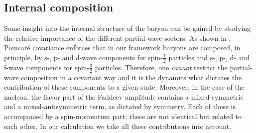 \subsection*{Internal composition}\label{subsec:internal_composition}
Some insight into the internal structure of the baryon can be gained by 
studying the relative importance of the different partial-wave sectors. 
As shown in \cite{Eichmann:2009qa,Eichmann:2009en,SanchisAlepuz:2011jn}, 
Poincar\'e covariance enforces that in our framework baryons are composed, 
in principle, by s-, p- and d-wave components for spin-$\frac{1}{2}$ 
particles and s-, p-, d- and f-wave components for spin-$\frac{3}{2}$
particles. Therefore, one \textit{cannot} restrict the partial-wave 
composition in a covariant way and it is the dynamics what 
dictates the contribution of these components to a given state. Moreover, 
in the case of the nucleon, the flavor part of the Faddeev amplitude contains 
a mixed-symmetric and a mixed-antisymmetric term, as dictated by symmetry. 
Each of these is accompanied by a spin-momentum part; these are not identical
but related to each other. In our calculation we take all these contributions
into account. \\

